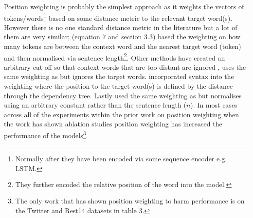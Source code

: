 Position weighting is probably the simplest approach as it weights the vectors of tokens/words\footnote{Normally after they have been encoded via some sequence encoder e.g. LSTM.} based on some distance metric to the relevant target word(s). However there is no one standard distance metric in the literature but a lot of them are very similar; \citet{chen-etal-2017-recurrent} (equation 7 and section 3.3) based the weighting on how many tokens are between the context word and the nearest target word (token) and then normalised via sentence length\footnote{They further encoded the relative position of the word into the model.}. Other methods have created an arbitrary cut off so that context words that are too distant are ignored \citep{he-etal-2018-effective, zhao2019modeling}, \citet{zhang-etal-2019-aspect} uses the same weighting as \citet{chen-etal-2017-recurrent} but ignores the target words. \citet{he-etal-2018-effective} incorporated syntax into the weighting where the position to the target word(s) is defined by the distance through the dependency tree. Lastly \citet{li-etal-2018-transformation} used the same weighting as \citet{chen-etal-2017-recurrent} but normalises using an arbitrary constant rather than the sentence length ($n$).  In most cases across all of the experiments within the prior work on position weighting when the work has shown ablation studies position weighting has increased the performance of the models\footnote{The only work that has shown position weighting to harm performance is \citet{zhang-etal-2019-aspect} on the Twitter and Rest14 datasets in table 3.}. 

